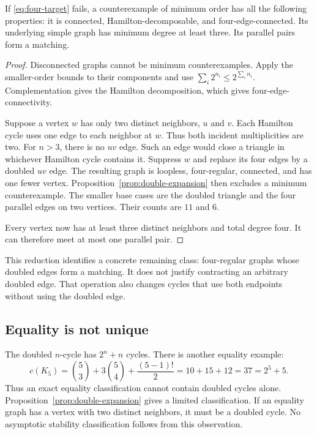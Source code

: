\begin{corollary}\label{cor:four-core}
If \eqref{eq:four-target} fails, a counterexample of minimum order has all the following properties:
it is connected, Hamilton-decomposable, and four-edge-connected.
Its underlying simple graph has minimum degree at least three.
Its parallel pairs form a matching.
\end{corollary}

\begin{proof}
Disconnected graphs cannot be minimum counterexamples.
Apply the smaller-order bounds to their components and use $\sum_i2^{n_i}\le2^{\sum_i n_i}$.
Complementation gives the Hamilton decomposition, which gives four-edge-connectivity.

Suppose a vertex $w$ has only two distinct neighbors, $u$ and $v$.
Each Hamilton cycle uses one edge to each neighbor at $w$.
Thus both incident multiplicities are two.
For $n>3$, there is no $uv$ edge.
Such an edge would close a triangle in whichever Hamilton cycle contains it.
Suppress $w$ and replace its four edges by a doubled $uv$ edge.
The resulting graph is loopless, four-regular, connected, and has one fewer vertex.
Proposition~\ref{prop:double-expansion} then excludes a minimum counterexample.
The smaller base cases are the doubled triangle and the four parallel edges on two vertices.
Their counts are $11$ and $6$.

Every vertex now has at least three distinct neighbors and total degree four.
It can therefore meet at most one parallel pair.
\end{proof}

This reduction identifies a concrete remaining class: four-regular graphs whose doubled edges form a matching.
It does not justify contracting an arbitrary doubled edge.
That operation also changes cycles that use both endpoints without using the doubled edge.

\subsection{Equality is not unique}

The doubled $n$-cycle has $2^n+n$ cycles.
There is another equality example:
\[
 c(K_5)=\binom53+3\binom54+\frac{(5-1)!}{2}
       =10+15+12=37=2^5+5.
\]
Thus an exact equality classification cannot contain doubled cycles alone.
Proposition~\ref{prop:double-expansion} gives a limited classification.
If an equality graph has a vertex with two distinct neighbors, it must be a doubled cycle.
No asymptotic stability classification follows from this observation.

